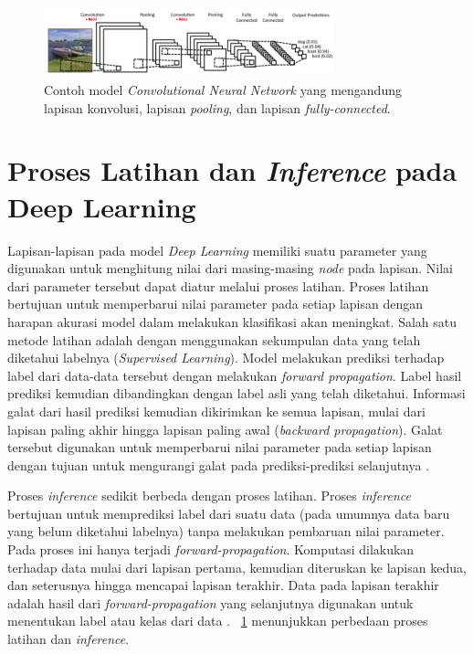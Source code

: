 \begin{figure}
	\centering
	\includegraphics[width=0.75\textwidth]
	{pics/cnn.png}
	\caption{Contoh model \textit{Convolutional Neural Network} yang mengandung lapisan konvolusi, lapisan \textit{pooling}, dan lapisan \textit{fully-connected}.}
	\label{fig:cnn}
\end{figure}

\section{Proses Latihan dan \textit{Inference} pada Deep Learning}
Lapisan-lapisan pada model \textit{Deep Learning} memiliki suatu parameter yang digunakan untuk menghitung nilai dari masing-masing \textit{node} pada lapisan. Nilai dari parameter tersebut dapat diatur melalui proses latihan. Proses latihan bertujuan untuk memperbarui nilai parameter pada setiap lapisan dengan harapan akurasi model dalam melakukan klasifikasi akan meningkat. Salah satu metode latihan adalah dengan menggunakan sekumpulan data yang telah diketahui labelnya (\textit{Supervised Learning}). Model melakukan prediksi terhadap label dari data-data tersebut dengan melakukan \textit{forward propagation}. Label hasil prediksi kemudian dibandingkan dengan label asli yang telah diketahui. Informasi galat dari hasil prediksi kemudian dikirimkan ke semua lapisan, mulai dari lapisan paling akhir hingga lapisan paling awal (\textit{backward propagation}). Galat tersebut digunakan untuk memperbarui nilai parameter pada setiap lapisan dengan tujuan untuk mengurangi galat pada prediksi-prediksi selanjutnya \cite{deeplearning}. 

Proses \textit{inference} sedikit berbeda dengan proses latihan. Proses \textit{inference} bertujuan untuk memprediksi label dari suatu data (pada umumnya data baru yang belum diketahui labelnya) tanpa melakukan pembaruan nilai parameter. Pada proses ini hanya terjadi \textit{forward-propagation}. Komputasi dilakukan terhadap data mulai dari lapisan pertama, kemudian diteruskan ke lapisan kedua, dan seterusnya hingga mencapai lapisan terakhir. Data pada lapisan terakhir adalah hasil dari \textit{forward-propagation} yang selanjutnya digunakan untuk menentukan label atau kelas dari data \cite{trainvsinfer}. \pic~\ref{fig:cnn} menunjukkan perbedaan proses latihan dan \textit{inference}.

